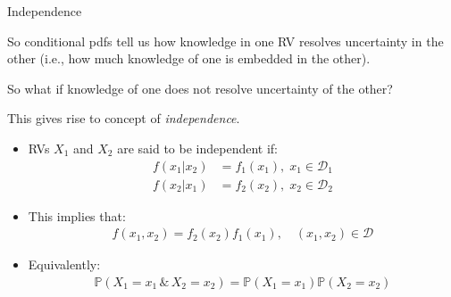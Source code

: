 \documentclass[handout,9pt]{beamer}
\begin{document}
%
\begin{frame}{Independence}

So conditional pdfs tell us how knowledge in one RV resolves uncertainty in the other (i.e., how much knowledge of one is embedded in the other). 
\begin{block}{}
So what if knowledge of one does not resolve uncertainty of the other? 
\end{block}
This gives rise to concept of {\em independence}.

\begin{itemize}
\setlength{\itemsep}{10pt}
\item RVs $X_1$ and $X_2$ are said to be independent if:
\begin{align*}
f(x_1|x_2)&=f_1(x_1),\; x_1\in \mathcal{D}_1\\
f(x_2|x_1)&=f_2(x_2),\; x_2\in \mathcal{D}_2
\end{align*}
\item This implies that:
 \begin{align*}
{f(x_1,x_2)}={f_2(x_2)}f_1(x_1),\quad (x_1,x_2)\in \mathcal{D}
\end{align*}
\item Equivalently:
 \begin{align*}
\mathbb{P}(X_1=x_1\,\&\,X_2=x_2)=\mathbb{P}(X_1=x_1)\mathbb{P}(X_2=x_2)
\end{align*}

\end{itemize}

\end{frame}
\end{document}
